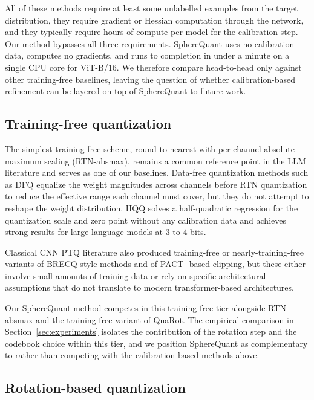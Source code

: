 All of these methods require at least some unlabelled examples from the
target distribution, they require gradient or Hessian computation
through the network, and they typically require hours of compute per
model for the calibration step. Our method bypasses all three
requirements. SphereQuant uses no calibration data, computes no gradients, and
runs to completion in under a minute on a single CPU core for ViT-B/16.
We therefore compare head-to-head only against other training-free
baselines, leaving the question of whether calibration-based refinement
can be layered on top of SphereQuant to future work.

\subsection{Training-free quantization}

The simplest training-free scheme, round-to-nearest with per-channel
absolute-maximum scaling (RTN-absmax), remains a common reference point
in the LLM literature and serves as one of our baselines. Data-free
quantization methods such as DFQ \citep{nagel2019dfq} equalize the
weight magnitudes across channels before RTN quantization to reduce the
effective range each channel must cover, but they do not attempt to
reshape the weight distribution. HQQ \citep{badri2023hqq} solves a
half-quadratic regression for the quantization scale and zero point
without any calibration data and achieves strong results for large
language models at 3 to 4 bits.

Classical CNN PTQ literature also produced training-free or
nearly-training-free variants of BRECQ-style methods and of PACT
\citep{choi2018pact}-based clipping, but these either involve small
amounts of training data or rely on specific architectural assumptions
that do not translate to modern transformer-based architectures.

Our SphereQuant method competes in this training-free tier alongside RTN-absmax
and the training-free variant of QuaRot. The empirical comparison in
Section~\ref{sec:experiments} isolates the contribution of the rotation
step and the codebook choice within this tier, and we position SphereQuant as
complementary to rather than competing with the calibration-based
methods above.

\subsection{Rotation-based quantization}

